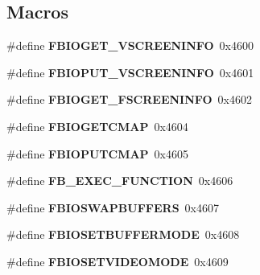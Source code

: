 \subsection*{Macros}
\begin{DoxyCompactItemize}
\item 
\mbox{\label{group__libmisc__fb_ga140bb702dad2959090d3117088b3b412}} 
\#define {\bfseries F\+B\+I\+O\+G\+E\+T\+\_\+\+V\+S\+C\+R\+E\+E\+N\+I\+N\+FO}~0x4600
\item 
\mbox{\label{group__libmisc__fb_ga17ec7c2cf2f365da211bc8697de28860}} 
\#define {\bfseries F\+B\+I\+O\+P\+U\+T\+\_\+\+V\+S\+C\+R\+E\+E\+N\+I\+N\+FO}~0x4601
\item 
\mbox{\label{group__libmisc__fb_ga692fc640698d6b00cd291f2b1ce1b1b8}} 
\#define {\bfseries F\+B\+I\+O\+G\+E\+T\+\_\+\+F\+S\+C\+R\+E\+E\+N\+I\+N\+FO}~0x4602
\item 
\mbox{\label{group__libmisc__fb_ga3dfe7eef1dda19060e8b56a6ce3b4bf6}} 
\#define {\bfseries F\+B\+I\+O\+G\+E\+T\+C\+M\+AP}~0x4604
\item 
\mbox{\label{group__libmisc__fb_ga56022c754c0ec921f89279be72931e61}} 
\#define {\bfseries F\+B\+I\+O\+P\+U\+T\+C\+M\+AP}~0x4605
\item 
\mbox{\label{group__libmisc__fb_gac3d1d46cb14429657e99137c6c8bb01d}} 
\#define {\bfseries F\+B\+\_\+\+E\+X\+E\+C\+\_\+\+F\+U\+N\+C\+T\+I\+ON}~0x4606
\item 
\mbox{\label{group__libmisc__fb_ga2ed9ae591dec9a23be9467f5b95fca0a}} 
\#define {\bfseries F\+B\+I\+O\+S\+W\+A\+P\+B\+U\+F\+F\+E\+RS}~0x4607
\item 
\mbox{\label{group__libmisc__fb_ga906d675eee368ceb045eafcea0c83884}} 
\#define {\bfseries F\+B\+I\+O\+S\+E\+T\+B\+U\+F\+F\+E\+R\+M\+O\+DE}~0x4608
\item 
\mbox{\label{group__libmisc__fb_ga299ae089ff88129fd8393c231b075482}} 
\#define {\bfseries F\+B\+I\+O\+S\+E\+T\+V\+I\+D\+E\+O\+M\+O\+DE}~0x4609
\item 

\end{DoxyCompactItemize}
